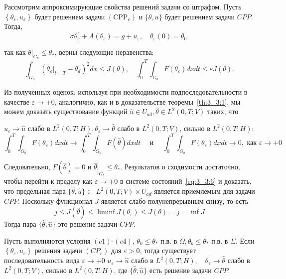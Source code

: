 Рассмотрим аппроксимирующие свойства решений задачи со штрафом.
Пусть $\left\{\theta_{\varepsilon}, u_{\varepsilon}\right\}$ будет решением задачи
$\left(\mathrm{CPP}_{\varepsilon}\right)$ и $\{\theta, u\}$ будет решением задачи $CPP$.
Тогда,
\begin{equation}
    \label{eq:3_3:6}
    \sigma \theta_{\varepsilon}^{\prime}
    + A\left(\theta_{\varepsilon}\right)=g + u_{\varepsilon},
    \quad \theta_{\varepsilon}(0) = \theta_{0}.
\end{equation}

так как $\left.\theta\right|_{G_{b}} \leq \theta_{*}$, верны следующие неравенства:
\[
    \int_{G_{d}}\left(\left.\theta_{\varepsilon}\right|_{t=T}-\theta_{d}\right)^{2} d x \leq J(\theta),
    \quad \int_{0}^{T} \int_{G_{b}} F\left(\theta_{\varepsilon}\right) d x d t \leq \varepsilon J(\theta).
\]

Из полученных оценок, используя при необходимости подпоследовательности в качестве
$\varepsilon \rightarrow+0$, аналогично, как и в доказательстве теоремы~\ref{th:3_3:1},
мы можем доказать существование функций
$\widehat{u} \in U_{a d}, \widehat{\theta} \in L^{2}(0, T ; V)$ таких, что

$u_{\varepsilon} \rightarrow \widehat{u}$ слабо в
$L^{2}(0, T ; H), \theta_{\varepsilon} \rightarrow \widehat{\theta}$ слабо в $L^{2}(0, T ; V)$,
сильно в $L^{2}(0, T ; H)$;
\[
    \int_{0}^{T} \int_{G_{b}} F\left(\theta_{\varepsilon}\right) d x d t \rightarrow \int_{0}^{T}
    \int_{G_{b}} F(\widehat{\theta}) dx dt \quad \text { и } \quad \int_{0}^{T} \int_{G_{b}}
    F\left(\theta_{\varepsilon}\right) dx dt \rightarrow 0, \text { как } \varepsilon \rightarrow+0
\]

Следовательно, $F(\widehat{\theta})=0$ и $\left.\widehat{\theta}\right|_{G_{b}} \leq \theta_{*}$.
Результатов о сходимости достаточно, чтобы перейти к пределу как $\varepsilon \rightarrow+0$
в системе состояний~\eqref{eq:3_3:6} и доказать, что предельная пара
$\{\widehat{\theta}, \widehat{u}\} \in$ $L^{2}(0, T ; V) \times U_{a d}$
является приемлемым для задачи $CPP$.
Поскольку функционал $J$ является слабо полунепрерывным снизу, то есть
\[
    j \leq J(\widehat{\theta}) \leq \liminf J\left(\theta_{\varepsilon}\right) \leq J(\theta)=j=\inf J
\]
Тогда пара $\{\widehat{\theta}, \widehat{u}\}$ это решение задачи $CPP$.
\begin{theorem}
    Пусть выполняются условия $(c1)$-$(c4)$,
    $\theta_{0} \leq \theta_{*}$ п.в. в $\Omega, \theta_{b} \leq \theta_{*}$ п.в. в
    $\Sigma$.
    Если $\left\{\theta_{\varepsilon}, u_{\varepsilon}\right\}$ решения задачи
    $\left(C P_{\varepsilon}\right)$ для $\varepsilon>0$, тогда существует последовательность вида
    $\varepsilon \rightarrow+0$ $u_{\varepsilon} \rightarrow \widehat{u}$ слабо в
    $L^{2}(0, T ; H), \quad \theta_{\varepsilon} \rightarrow \widehat{\theta}$
    слабо в $L^{2}(0, T ; V)$,
    сильно в $L^{2}(0, T ; H)$, где
    $\{\widehat{\theta}, \widehat{u}\}$ есть решение задачи $CPP$.
\end{theorem}
